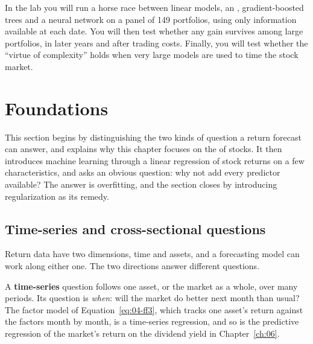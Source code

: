 In the lab you will run a horse race between linear models, an , gradient-boosted trees and a neural network on a panel of 149 portfolios, using only information available at each date. You will then test whether any gain survives among large portfolios, in later years and after trading costs. Finally, you will test whether the ``virtue of complexity'' holds when very large models are used to time the stock market.


\section{Foundations}
\label{sec:20-foundations}

This section begins by distinguishing the two kinds of question a return forecast can answer, and explains why this chapter focuses on the  of stocks. It then introduces machine learning through a linear regression of stock returns on a few characteristics, and asks an obvious question: why not add every predictor available? The answer is overfitting, and the section closes by introducing regularization as its remedy.

\subsection{Time-series and cross-sectional questions}
\label{sec:20-crosssection}

Return data have two dimensions, time and assets, and a forecasting model can work along either one. The two directions answer different questions.

A \textbf{time-series} question follows one asset, or the market as a whole, over many periods. Its question is \emph{when}: will the market do better next month than usual? The factor model of Equation~\eqref{eq:04-ff3}, which tracks one asset's return against the factors month by month, is a time-series regression, and so is the predictive regression of the market's return on the dividend yield in Chapter~\ref{ch:06}.

